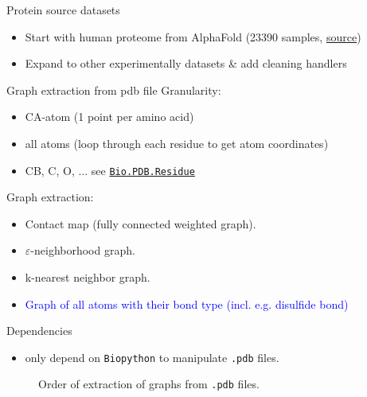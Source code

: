 \documentclass[aspectratio=169, 10pt, dvipsnames, handout]{beamer}
\begin{document}
\begin{frame}[fragile]{Protein source datasets}
  \begin{itemize}
  \item Start with human proteome from AlphaFold (23390 samples,
    \href{https://ftp.ebi.ac.uk/pub/databases/alphafold/latest/UP000005640_9606_HUMAN_v2.tar}{source})
  \item Expand to other experimentally datasets \& add cleaning handlers
  \end{itemize}
\end{frame}

\begin{frame}[fragile]{Graph extraction from pdb file}
  Granularity:
  \begin{itemize}
  \item CA-atom (1 point per amino acid)
  \item all atoms (loop through each residue to get atom coordinates)
  \item CB, C, O, ... see \href{https://biopython.org/docs/1.75/api/Bio.PDB.Residue.html}{\texttt{Bio.PDB.Residue}}
  \end{itemize}
  Graph extraction:
  \begin{itemize}
  \item Contact map (fully connected weighted graph).
  \item $\varepsilon$-neighborhood graph. \cite{anastasiu2016algorithms}
  \item k-nearest neighbor graph. \cite{zhao2021approximate}
  \item \textcolor{blue}{Graph of all atoms with their bond type (incl. e.g. disulfide bond)}

  \end{itemize}

  Dependencies
  \begin{itemize}
  \item only depend on \texttt{Biopython} to manipulate \texttt{.pdb} files.
  \end{itemize}
  \endminipage
  \begin{figure}[center]
    \centering
    \caption{Order of extraction of graphs from \texttt{.pdb} files.}
    \label{fig:overview}
  \end{figure}
  \endminipage

\end{frame}
\end{document}
